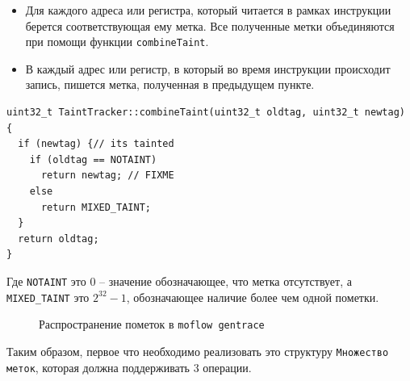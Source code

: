 \begin{itemize}
    \item Для каждого адреса или регистра, который читается в рамках инструкции берется соответствующая ему метка. Все полученные метки объединяются при помощи функции \texttt{combineTaint}.
    \item В каждый адрес или регистр, в который во время инструкции происходит запись, пишется метка, полученная в предыдущем пункте.
\end{itemize}

\begin{lstlisting}[environoment=cpp_code,captionpos=b]
uint32_t TaintTracker::combineTaint(uint32_t oldtag, uint32_t newtag)
{
  if (newtag) {// its tainted
    if (oldtag == NOTAINT)
      return newtag; // FIXME
    else 
      return MIXED_TAINT;
  }
  return oldtag;
}
\end{lstlisting}

Где \texttt{NOTAINT} это $0$ -- значение обозначающее, что метка отсутствует, а \texttt{MIXED\_TAINT} это $2^{32}-1$, обозначающее наличие более чем одной пометки.

\begin{figure}[H]
    \caption{Распространение пометок в \texttt{moflow gentrace}}
    \label{fig:moflow2}
\end{figure}

Таким образом, первое что необходимо реализовать это структуру \texttt{Множество меток}, которая должна поддерживать $3$ операции.

